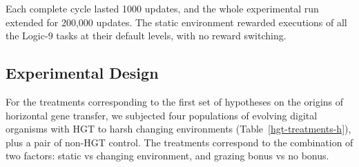 \documentclass[letterpaper]{article}
\begin{document}
Each complete cycle lasted 1000 updates, and the whole experimental run extended for 200,000 updates.
The static environment rewarded executions of all the Logic-9 tasks at their default levels, with no reward switching.

\subsection{Experimental Design}
For the treatments corresponding to the first set of hypotheses on the origins of horizontal gene transfer, we subjected four populations of evolving digital organisms with HGT to harsh changing environments (Table~\ref{hgt-treatments-h}), plus a pair of non-HGT control. The treatments correspond to the combination of two factors: static vs changing environment, and grazing bonus vs no bonus.

\end{document}
